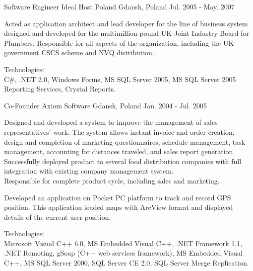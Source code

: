 \begin{cventries}
\cventry
{Software Engineer} %
{Ideal Host Poland} %
{Gdansk, Poland} %
{Jul. 2005 - May. 2007} %
{
  \begin{cvitems} %
    \item
    {
      Acted as application architect and lead developer for the line of business system
      designed and developed for the multimillion-pound UK Joint Industry Board for Plumbers.
      Responsible for all aspects of the organization, including the UK government CSCS scheme and NVQ distribution.
    }
    \item
    {
      Technologies:\\
      {C\#}, .NET 2.0, Windows Forms, MS SQL Server 2005, MS SQL Server 2005 Reporting Services, Crystal Reports. \\
    }
  \end{cvitems}
}

\cventry
{Co-Founder} %
{Axiom Software} %
{Gdansk, Poland} %
{Jan. 2004 - Jul. 2005} %
{
  \begin{cvitems} %
    \item
    {
      Designed and developed a system to improve the management of sales representatives' work. The system allows instant invoice and order creation, design and completion of marketing questionnaires, schedule management, task management, accounting for distances traveled, and sales report generation.
      Successfully deployed product to several food distribution companies with full integration with existing company management system. \\
      Responsible for complete product cycle, including sales and marketing.
    }
    \item
    {
      Developed an application on Pocket PC platform to track and record GPS position. This application loaded maps with ArcView format and displayed details of the current user position.
    }
    \item
    {
      Technologies:\\
      Microsoft Visual C++ 6.0, MS Embedded Visual C++, .NET Framework 1.1,
      .NET Remoting, gSoap (C++ web services framework), MS Embedded Visual C++,
      MS SQL Server 2000, SQL Server CE 2.0, SQL Server Merge Replication. \\
    }
  \end{cvitems}
}


\end{cventries}
